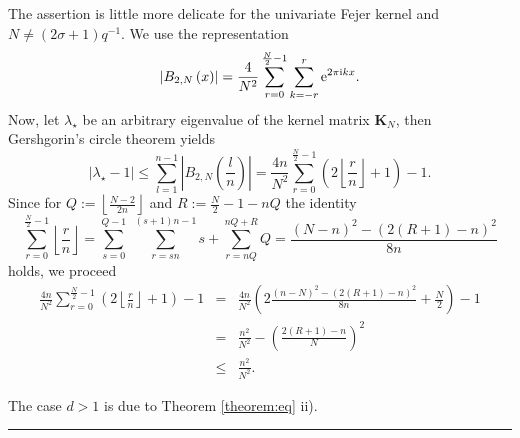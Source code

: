 \documentclass[11pt,a4paper,bibtotoc]{scrartcl}
\def\ti{\mbox{\scriptsize{\rm i}}}
\newcommand{\eip}[1]{{\rm e}^{ 2\pi{\ti} #1}}
\newcommand{\zb}[1]{\ensuremath{\boldsymbol{#1}}}
\renewcommand{\Box}{\hspace*{0ex} \hfill \rule{1.5ex}{1.5ex} \\ \goodbreak}
\numberwithin{equation}{section}
\numberwithin{table}{section}
\numberwithin{figure}{section}
\begin{document}
The assertion is little more delicate for the univariate Fejer kernel and
$N\neq\left(2\sigma+1\right)q^{-1}$.
We use the representation
\begin{equation*}
  \left|B_{2,N}\left(x\right)\right| = \frac{4}{N^2}
  \sum\limits_{r=0}^{\frac{N}{2}-1} \sum\limits_{k=-r}^{r} \eip{kx}.
\end{equation*}
Now, let $\lambda_{\star}$ be an arbitrary eigenvalue of the kernel matrix
$\zb K_N$, then Gershgorin's circle theorem yields
\begin{equation*}
  \left|\lambda_{\star}-1\right|
  \le \sum_{l=1}^{n-1}\left|B_{2,N}\left(\frac{l}{n}\right)\right|
   = \frac{4n}{N^2} \sum\limits_{r=0}^{\frac{N}{2}-1}
   \left(2\left\lfloor \frac{r}{n} \right\rfloor+1\right) - 1.
\end{equation*}
Since for $Q:=\left\lfloor\frac{N-2}{2n}\right\rfloor$ and $R:=\frac{N}{2}-1-nQ$ the identity
\begin{equation*}
  \sum\limits_{r=0}^{\frac{N}{2}-1}\left\lfloor \frac{r}{n} \right\rfloor
  =\sum\limits_{s=0}^{Q-1}\;\sum\limits_{r=sn}^{\left(s+1\right)n-1} s + \sum_{r=nQ}^{nQ+R} Q
  =\frac{\left(N-n\right)^2 - \left(2\left(R+1\right)-n\right)^2}{8n}
\end{equation*}
holds, we proceed
\begin{eqnarray*}
  \frac{4n}{N^2} \sum\limits_{r=0}^{\frac{N}{2}-1}
  \left(2\left\lfloor \frac{r}{n} \right\rfloor+1\right) - 1
  &= &\frac{4n}{N^2} \left(2 \frac{\left(n-N\right)^2 - \left(2\left(R+1\right)-n\right)^2}{8n} + \frac{N}{2}\right) - 1\\
  &= &\frac{n^2}{N^2}-\left(\frac{2\left(R+1\right)-n}{N}\right)^2\\
  &\le & \frac{n^2}{N^2}.
\end{eqnarray*}

The case $d>1$ is due to Theorem \ref{theorem:eq} ii).
\Box
\end{document}
